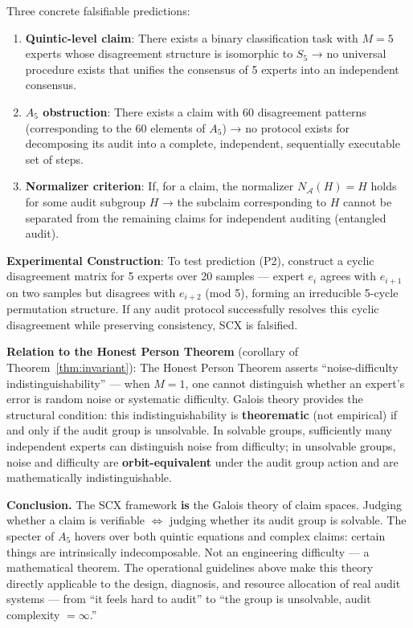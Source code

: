 \documentclass[10pt,a4paper]{article}
\theoremstyle{remark}
\begin{document}
Three concrete falsifiable predictions:
\begin{enumerate}[label=(P\arabic*)]
  \item \textbf{Quintic-level claim}: There exists a binary classification task with $M=5$ experts whose disagreement structure is isomorphic to $S_5$ → no universal procedure exists that unifies the consensus of 5 experts into an independent consensus.
  \item \textbf{$A_5$ obstruction}: There exists a claim with 60 disagreement patterns (corresponding to the 60 elements of $A_5$) → no protocol exists for decomposing its audit into a complete, independent, sequentially executable set of steps.
  \item \textbf{Normalizer criterion}: If, for a claim, the normalizer $N_{\mathcal{A}}(H) = H$ holds for some audit subgroup $H$ → the subclaim corresponding to $H$ cannot be separated from the remaining claims for independent auditing (entangled audit).
\end{enumerate}

\textbf{Experimental Construction}: To test prediction (P2), construct a cyclic disagreement matrix for 5 experts over 20 samples --- expert $e_i$ agrees with $e_{i+1}$ on two samples but disagrees with $e_{i+2}$ (mod 5), forming an irreducible 5-cycle permutation structure. If any audit protocol successfully resolves this cyclic disagreement while preserving consistency, SCX is falsified.

\textbf{Relation to the Honest Person Theorem} (corollary of Theorem~\ref{thm:invariant}): The Honest Person Theorem asserts ``noise-difficulty indistinguishability'' --- when $M=1$, one cannot distinguish whether an expert's error is random noise or systematic difficulty. Galois theory provides the structural condition: this indistinguishability is \textbf{theorematic} (not empirical) if and only if the audit group is unsolvable. In solvable groups, sufficiently many independent experts can distinguish noise from difficulty; in unsolvable groups, noise and difficulty are \textbf{orbit-equivalent} under the audit group action and are mathematically indistinguishable.

\textbf{Conclusion.} The SCX framework \textbf{is} the Galois theory of claim spaces. Judging whether a claim is verifiable $\iff$ judging whether its audit group is solvable. The specter of $A_5$ hovers over both quintic equations and complex claims: certain things are intrinsically indecomposable. Not an engineering difficulty --- a mathematical theorem. The operational guidelines above make this theory directly applicable to the design, diagnosis, and resource allocation of real audit systems --- from ``it feels hard to audit'' to ``the group is unsolvable, audit complexity $=\infty$.''
\end{document}
